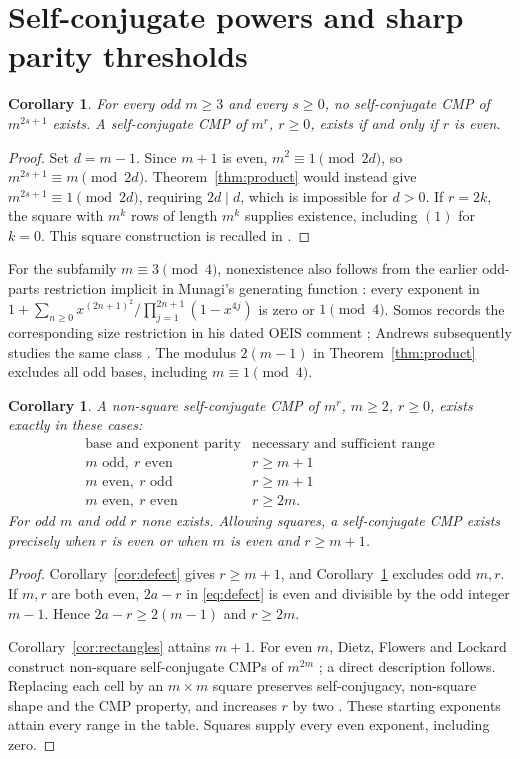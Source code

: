 \documentclass[11pt]{article}
\newtheorem{corollary}[theorem]{Corollary}
\begin{document}
\section{Self-conjugate powers and sharp parity thresholds}
\begin{corollary}\label{cor:negative}
For every odd $m\geq3$ and every $s\geq0$, no self-conjugate CMP of
$m^{2s+1}$ exists. A self-conjugate CMP of $m^r$, $r\geq0$, exists
if and only if $r$ is even.
\end{corollary}
\begin{proof}
Set $d=m-1$. Since $m+1$ is even, $m^2\equiv1\pmod{2d}$, so
$m^{2s+1}\equiv m\pmod{2d}$. Theorem~\ref{thm:product} would instead
give $m^{2s+1}\equiv1\pmod{2d}$, requiring $2d\mid d$, which is
impossible for $d>0$. If $r=2k$, the square with $m^k$ rows of
length $m^k$ supplies existence, including $(1)$ for $k=0$.
This square construction is recalled in
\cite[Discussion~5.11, p.~404]{DFL}.
\end{proof}
For the subfamily $m\equiv3\pmod4$, nonexistence also follows from the
earlier odd-parts restriction implicit in Munagi's generating function
\cite[Theorem~5.2, p.~2500]{Munagi}: every exponent in
$1+\sum_{n\geq0}x^{(2n+1)^2}/\prod_{j=1}^{2n+1}(1-x^{4j})$
is zero or $1\pmod4$. Somos records the corresponding size restriction
in his dated OEIS comment \cite{OEIS}; Andrews subsequently studies
the same class \cite[\S3, Lemma~3.1]{Andrews}.
The modulus $2(m-1)$ in Theorem~\ref{thm:product} excludes all odd bases,
including $m\equiv1\pmod4$.

\begin{corollary}\label{cor:classification}
A non-square self-conjugate CMP of $m^r$, $m\geq2$, $r\geq0$, exists
exactly in these cases:
\[
\begin{array}{c|c}
\text{base and exponent parity}&\text{necessary and sufficient range}\\\hline
m\text{ odd},\ r\text{ even}&r\geq m+1\\
m\text{ even},\ r\text{ odd}&r\geq m+1\\
m\text{ even},\ r\text{ even}&r\geq2m.
\end{array}
\]
For odd $m$ and odd $r$ none exists. Allowing squares, a self-conjugate
CMP exists precisely when $r$ is even or when $m$ is even and $r\geq m+1$.
\end{corollary}
\begin{proof}
Corollary~\ref{cor:defect} gives $r\geq m+1$, and
Corollary~\ref{cor:negative} excludes odd $m,r$.
If $m,r$ are both even, $2a-r$ in \eqref{eq:defect} is even and
divisible by the odd integer $m-1$. Hence $2a-r\geq2(m-1)$ and
$r\geq2m$.

Corollary~\ref{cor:rectangles} attains $m+1$. For even $m$, Dietz,
Flowers and Lockard construct non-square self-conjugate CMPs of
$m^{2m}$ \cite[Corollaries~5.7--5.10, pp.~403--404]{DFL}; a direct
description follows. Replacing each cell by an $m\times m$ square
preserves self-conjugacy, non-square shape and the CMP property,
and increases $r$ by two \cite[Theorem~5.4, p.~469]{FL}.
These starting exponents attain every range in the table.
Squares supply every even exponent, including zero.
\end{proof}
\end{document}
